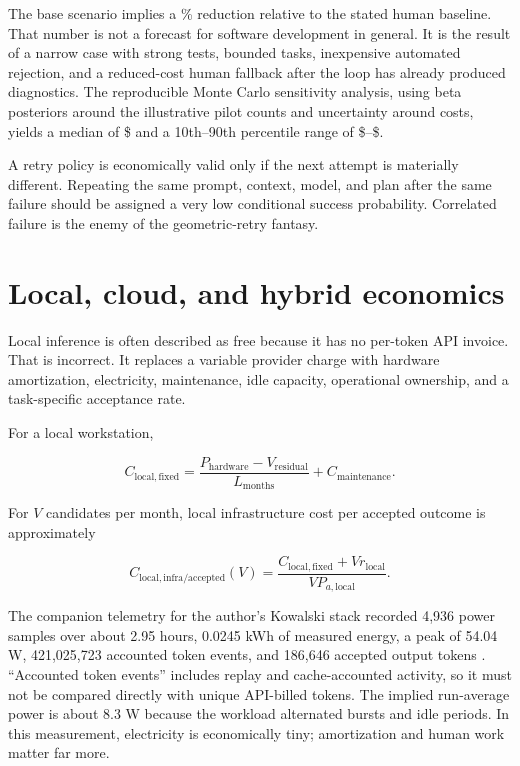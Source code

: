 \documentclass[11pt]{article}
\begin{document}
The base scenario implies a \CascadeSavingsPercent{}\% reduction relative to the stated human baseline. That number is not a forecast for software development in general. It is the result of a narrow case with strong tests, bounded tasks, inexpensive automated rejection, and a reduced-cost human fallback after the loop has already produced diagnostics. The reproducible Monte Carlo sensitivity analysis, using beta posteriors around the illustrative pilot counts and uncertainty around costs, yields a median of \$\MonteCarloMedian{} and a 10th--90th percentile range of \$\MonteCarloPten{}--\$\MonteCarloPninety{}.

\begin{warningbox}
A retry policy is economically valid only if the next attempt is materially different. Repeating the same prompt, context, model, and plan after the same failure should be assigned a very low conditional success probability. Correlated failure is the enemy of the geometric-retry fantasy.
\end{warningbox}

\section{Local, cloud, and hybrid economics}

Local inference is often described as free because it has no per-token API invoice. That is incorrect. It replaces a variable provider charge with hardware amortization, electricity, maintenance, idle capacity, operational ownership, and a task-specific acceptance rate.

For a local workstation,

\begin{equation}
C_{\mathrm{local,fixed}}
=
\frac{P_{\mathrm{hardware}}-V_{\mathrm{residual}}}{L_{\mathrm{months}}}
+C_{\mathrm{maintenance}}.
\label{eq:local-fixed}
\end{equation}

For $V$ candidates per month, local infrastructure cost per accepted outcome is approximately

\begin{equation}
C_{\mathrm{local,infra/accepted}}(V)
=
\frac{C_{\mathrm{local,fixed}}+V r_{\mathrm{local}}}{V P_{a,\mathrm{local}}}.
\label{eq:local-accepted}
\end{equation}

The companion telemetry for the author's Kowalski stack recorded 4,936 power samples over about 2.95 hours, 0.0245 kWh of measured energy, a peak of 54.04 W, 421,025,723 accounted token events, and 186,646 accepted output tokens \cite{papaliniTelemetry}. ``Accounted token events'' includes replay and cache-accounted activity, so it must not be compared directly with unique API-billed tokens. The implied run-average power is about 8.3 W because the workload alternated bursts and idle periods. In this measurement, electricity is economically tiny; amortization and human work matter far more.
\end{document}
